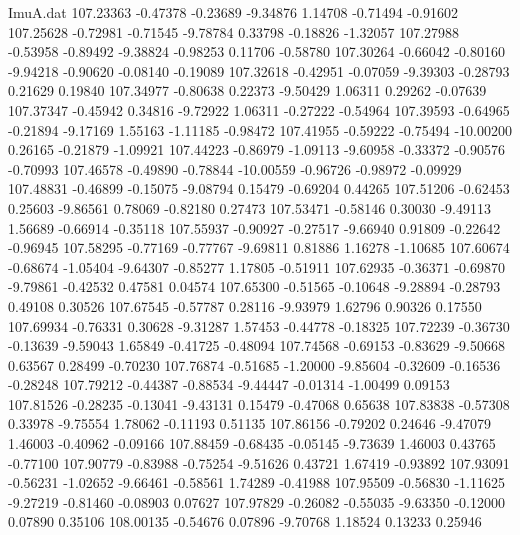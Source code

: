 \begin{filecontents}{ImuA.dat}
 107.23363   -0.47378   -0.23689   -9.34876    1.14708   -0.71494   -0.91602
 107.25628   -0.72981   -0.71545   -9.78784    0.33798   -0.18826   -1.32057
 107.27988   -0.53958   -0.89492   -9.38824   -0.98253    0.11706   -0.58780
 107.30264   -0.66042   -0.80160   -9.94218   -0.90620   -0.08140   -0.19089
 107.32618   -0.42951   -0.07059   -9.39303   -0.28793    0.21629    0.19840
 107.34977   -0.80638    0.22373   -9.50429    1.06311    0.29262   -0.07639
 107.37347   -0.45942    0.34816   -9.72922    1.06311   -0.27222   -0.54964
 107.39593   -0.64965   -0.21894   -9.17169    1.55163   -1.11185   -0.98472
 107.41955   -0.59222   -0.75494  -10.00200    0.26165   -0.21879   -1.09921
 107.44223   -0.86979   -1.09113   -9.60958   -0.33372   -0.90576   -0.70993
 107.46578   -0.49890   -0.78844  -10.00559   -0.96726   -0.98972   -0.09929
 107.48831   -0.46899   -0.15075   -9.08794    0.15479   -0.69204    0.44265
 107.51206   -0.62453    0.25603   -9.86561    0.78069   -0.82180    0.27473
 107.53471   -0.58146    0.30030   -9.49113    1.56689   -0.66914   -0.35118
 107.55937   -0.90927   -0.27517   -9.66940    0.91809   -0.22642   -0.96945
 107.58295   -0.77169   -0.77767   -9.69811    0.81886    1.16278   -1.10685
 107.60674   -0.68674   -1.05404   -9.64307   -0.85277    1.17805   -0.51911
 107.62935   -0.36371   -0.69870   -9.79861   -0.42532    0.47581    0.04574
 107.65300   -0.51565   -0.10648   -9.28894   -0.28793    0.49108    0.30526
 107.67545   -0.57787    0.28116   -9.93979    1.62796    0.90326    0.17550
 107.69934   -0.76331    0.30628   -9.31287    1.57453   -0.44778   -0.18325
 107.72239   -0.36730   -0.13639   -9.59043    1.65849   -0.41725   -0.48094
 107.74568   -0.69153   -0.83629   -9.50668    0.63567    0.28499   -0.70230
 107.76874   -0.51685   -1.20000   -9.85604   -0.32609   -0.16536   -0.28248
 107.79212   -0.44387   -0.88534   -9.44447   -0.01314   -1.00499    0.09153
 107.81526   -0.28235   -0.13041   -9.43131    0.15479   -0.47068    0.65638
 107.83838   -0.57308    0.33978   -9.75554    1.78062   -0.11193    0.51135
 107.86156   -0.79202    0.24646   -9.47079    1.46003   -0.40962   -0.09166
 107.88459   -0.68435   -0.05145   -9.73639    1.46003    0.43765   -0.77100
 107.90779   -0.83988   -0.75254   -9.51626    0.43721    1.67419   -0.93892
 107.93091   -0.56231   -1.02652   -9.66461   -0.58561    1.74289   -0.41988
 107.95509   -0.56830   -1.11625   -9.27219   -0.81460   -0.08903    0.07627
 107.97829   -0.26082   -0.55035   -9.63350   -0.12000    0.07890    0.35106
 108.00135   -0.54676    0.07896   -9.70768    1.18524    0.13233    0.25946

\end{filecontents}
